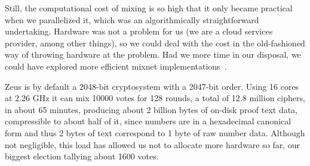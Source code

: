 \documentclass[jets]{usenixjournal}
\begin{document}
Still, the computational cost of mixing is so high that it only became
practical when we parallelized it, which was an algorithmically
straightforward undertaking. Hardware was not a problem for us (we are
a cloud services provider, among other things), so we could deal with
the cost in the old-fashioned way of throwing hardware at the problem.
Had we more time in our disposal, we could have explored more
efficient mixnet
implementations~\cite{bayer:2012,terelius:2010,wikstrom:2009}. 

Zeus is by default a 2048-bit cryptosystem with a 2047-bit order.
Using 16 cores at 2.26 GHz it can mix 10000 votes for 128 rounds,
a total of 12.8 million ciphers, in about 65 minutes,
producing about 2 billion bytes of on-disk proof text data,
compressible to about half of it,
since numbers are in a hexadecimal canonical form and thus
2 bytes of text correspond to 1 byte of raw number data.
Although not negligible, this load has allowed us
not to allocate more hardware so far,
our biggest election tallying about 1600 votes.

% 
% 
\end{document}
